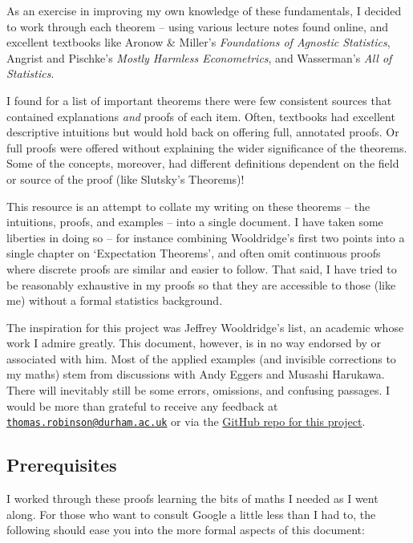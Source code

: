 \documentclass[
]{book}
\begin{document}
As an exercise in improving my own knowledge of these fundamentals, I decided to work through each theorem -- using various lecture notes found online, and excellent textbooks like Aronow \& Miller's \citeyearpar{aronow2019foundations} \emph{Foundations of Agnostic Statistics}, Angrist and Pischke's \citeyearpar{angrist2008mostly} \emph{Mostly Harmless Econometrics}, and Wasserman's \citeyearpar{WassermanAllStatisticsConcise2004} \emph{All of Statistics}.

I found for a list of important theorems there were few consistent sources that contained explanations \emph{and} proofs of each item. Often, textbooks had excellent descriptive intuitions but would hold back on offering full, annotated proofs. Or full proofs were offered without explaining the wider significance of the theorems. Some of the concepts, moreover, had different definitions dependent on the field or source of the proof (like Slutsky's Theorems)!

This resource is an attempt to collate my writing on these theorems -- the intuitions, proofs, and examples -- into a single document. I have taken some liberties in doing so -- for instance combining Wooldridge's first two points into a single chapter on `Expectation Theorems', and often omit continuous proofs where discrete proofs are similar and easier to follow. That said, I have tried to be reasonably exhaustive in my proofs so that they are accessible to those (like me) without a formal statistics background.

The inspiration for this project was Jeffrey Wooldridge's list, an academic whose work I admire greatly. This document, however, is in no way endorsed by or associated with him. Most of the applied examples (and invisible corrections to my maths) stem from discussions with Andy Eggers and Musashi Harukawa. There will inevitably still be some errors, omissions, and confusing passages. I would be more than grateful to receive any feedback at \href{mailto:thomas.robinson@durham.ac.uk}{\nolinkurl{thomas.robinson@durham.ac.uk}} or via the \href{github.com/tsrobinson/10EconTheorems}{GitHub repo for this project}.

\hypertarget{prerequisites}{%
\subsection*{Prerequisites}\label{prerequisites}}

I worked through these proofs learning the bits of maths I needed as I went along. For those who want to consult Google a little less than I had to, the following should ease you into the more formal aspects of this document:
\end{document}
